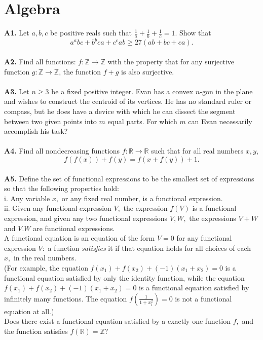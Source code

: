 \documentclass[12pt,a4paper]{article}
\begin{document}
\section*{Algebra}
\textbf{A1.} Let \(a, b, c\) be positive reals such that \(\frac{1}{a} + \frac{1}{b} + \frac{1}{c} = 1.\) Show that
\[{a^a}bc + {b^b}ca + {c^c}ab \ge 27 \left(ab + bc + ca \right).\]
\\
\textbf{A2.} Find all functions: \(f: \mathbb{Z} \to \mathbb{Z}\) with the property that for any surjective function \(g: \mathbb{Z} \to \mathbb{Z}\), the function \(f + g\) is also surjective.\\
\\
\textbf{A3.} Let \(n \ge 3\) be a fixed positive integer. Evan has a convex \(n\)-gon  in the plane and wishes to construct the centroid of its vertices. He has no standard ruler or compass, but he does have a device with which he can dissect the segment between two given points into \(m\) equal parts. For which \(m\) can Evan necessarily accomplish his task?\\
\\
\textbf{A4.} Find all nondecreasing functions \(f: \mathbb{R} \to \mathbb{R}\) such that for all real numbers \(x, y\),
\[f\left( {f\left( x \right)} \right) + f\left( y \right) = f\left( {x + f\left( y \right)} \right) + 1.\]
\\
\textbf{A5.} Define the set of functional expressions to be the smallest set of expressions so that the following properties hold:\\
i. Any variable \(x,\) or any fixed real number, is a functional expression.\\
ii. Given any functional expression \(V,\) the expression \(f \left( V \right)\) is a functional expression, and given any two functional expressions \(V, W,\) the expressions \(V + W\) and \(V . W\) are functional expressions.\\
A functional equation is an equation of the form \(V = 0\) for any functional expression \(V:\) a function \textit{satisfies} it if that equation holds for all choices of each \(x,\) in the real numbers. \\
(For example, the equation \(f \left( x_1 \right) + f \left( x_2 \right) + \left( -1 \right) \left( {x_1} + {x_2} \right) = 0\) is a functional equation satisfied by only the identity function, while the equation \(f \left( x_1 \right) + f \left( x_2 \right) + \left( -1 \right) \left( {x_1} + {x_2} \right) = 0\) is a functional equation satisfied by infinitely many functions. The equation \(f\left( {\frac{1}{{1 + x_1^2}}} \right) = 0\) is not a functional equation at all.)\\
Does there exist a functional equation satisfied by a exactly one function \(f,\) and the function satisfies \(f \left( \mathbb{R} \right) = \mathbb{Z}?\)\\
\\
\newpage
\end{document}

